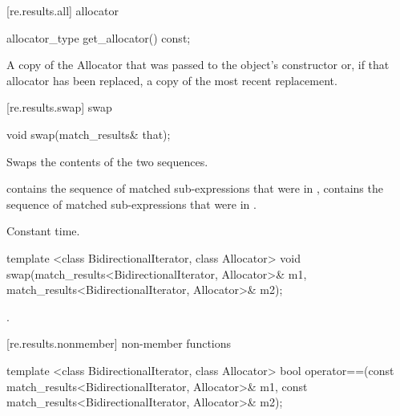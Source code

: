 [re.results.all]{ allocator}%

%
%
\begin{itemdecl}
allocator_type get_allocator() const;
\end{itemdecl}

\begin{itemdescr}
\pnum
\returns A copy of the Allocator that was passed to the object's constructor or, if that
allocator has been replaced, a copy of the most recent replacement.
\end{itemdescr}

[re.results.swap]{ swap}

%
%
\begin{itemdecl}
void swap(match_results& that); 
\end{itemdecl}

\begin{itemdescr}
\pnum\effects  Swaps the contents of the two sequences. 

\pnum\postcondition  {} contains the sequence of matched
sub-expressions that were in ,  contains the
sequence of matched sub-expressions that were in .

\pnum\complexity Constant time. 
\end{itemdescr}

%
%
\begin{itemdecl}
template <class BidirectionalIterator, class Allocator>
  void swap(match_results<BidirectionalIterator, Allocator>& m1,
            match_results<BidirectionalIterator, Allocator>& m2);
\end{itemdecl}

\pnum\effects {}.

[re.results.nonmember]{ non-member functions}

%
%
\begin{itemdecl}
template <class BidirectionalIterator, class Allocator>
bool operator==(const match_results<BidirectionalIterator, Allocator>& m1,
                const match_results<BidirectionalIterator, Allocator>& m2);
\end{itemdecl}

